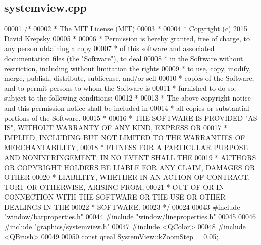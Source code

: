 \hypertarget{systemview_8cpp_source}{}\subsection{systemview.\+cpp}
\label{systemview_8cpp_source}

\begin{DoxyCode}
00001 \textcolor{comment}{/*}
00002 \textcolor{comment}{ * The MIT License (MIT)}
00003 \textcolor{comment}{ *}
00004 \textcolor{comment}{ * Copyright (c) 2015 David Krepsky}
00005 \textcolor{comment}{ *}
00006 \textcolor{comment}{ * Permission is hereby granted, free of charge, to any person obtaining a copy}
00007 \textcolor{comment}{ * of this software and associated documentation files (the "Software"), to deal}
00008 \textcolor{comment}{ * in the Software without restriction, including without limitation the rights}
00009 \textcolor{comment}{ * to use, copy, modify, merge, publish, distribute, sublicense, and/or sell}
00010 \textcolor{comment}{ * copies of the Software, and to permit persons to whom the Software is}
00011 \textcolor{comment}{ * furnished to do so, subject to the following conditions:}
00012 \textcolor{comment}{ *}
00013 \textcolor{comment}{ * The above copyright notice and this permission notice shall be included in}
00014 \textcolor{comment}{ * all copies or substantial portions of the Software.}
00015 \textcolor{comment}{ *}
00016 \textcolor{comment}{ * THE SOFTWARE IS PROVIDED "AS IS", WITHOUT WARRANTY OF ANY KIND, EXPRESS OR}
00017 \textcolor{comment}{ * IMPLIED, INCLUDING BUT NOT LIMITED TO THE WARRANTIES OF MERCHANTABILITY,}
00018 \textcolor{comment}{ * FITNESS FOR A PARTICULAR PURPOSE AND NONINFRINGEMENT. IN NO EVENT SHALL THE}
00019 \textcolor{comment}{ * AUTHORS OR COPYRIGHT HOLDERS BE LIABLE FOR ANY CLAIM, DAMAGES OR OTHER}
00020 \textcolor{comment}{ * LIABILITY, WHETHER IN AN ACTION OF CONTRACT, TORT OR OTHERWISE, ARISING FROM,}
00021 \textcolor{comment}{ * OUT OF OR IN CONNECTION WITH THE SOFTWARE OR THE USE OR OTHER DEALINGS IN THE}
00022 \textcolor{comment}{ * SOFTWARE.}
00023 \textcolor{comment}{ */}
00024 
00043 \textcolor{preprocessor}{#include "\hyperlink{barproperties_8h}{window/barproperties.h}"}
00044 \textcolor{preprocessor}{#include "\hyperlink{lineproperties_8h}{window/lineproperties.h}"}
00045 
00046 \textcolor{preprocessor}{#include "\hyperlink{systemview_8h}{graphics/systemview.h}"}
00047 \textcolor{preprocessor}{#include <QColor>}
00048 \textcolor{preprocessor}{#include <QBrush>}
00049 
00050 \textcolor{keyword}{const} qreal SystemView::kZoomStep = 0.05;

\end{DoxyCode}
